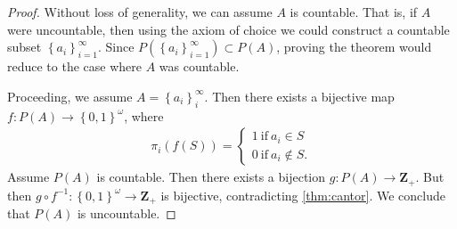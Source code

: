 \begin{proof}
	Without loss of generality, we can assume $A$ is countable. That is, if $A$
	were uncountable, then using the axiom of choice we could construct a
	countable subset $\left\{ a_{i} \right\}_{i=1}^{\infty}$. Since
	$P(\left\{ a_{i} \right\}_{i=1}^{\infty}) \subset P(A)$, proving the theorem
	would reduce to the case where $A$ was countable.

	Proceeding, we assume $A = \left\{ a_{i} \right\}_{i}^{\infty}$.
	Then there exists a bijective map $f: P(A) \to \left\{ 0,1 \right\}^{\omega}$,
	where
	\begin{equation*}
		\begin{split}
			\pi_{i}(f(S)) = \begin{cases}
				1 \ \text{if} \  a_{i} \in S \\
				0 \ \text{if} \ a_{i} \not \in S.
			\end{cases}
		\end{split}
	\end{equation*}
	Assume $P(A)$ is countable. Then there exists a bijection $g: P(A) \to
	\mathbf{Z}_{+}$. But then $g\circ f^{-1}: \left\{ 0,1 \right\}^{\omega} \to
	\mathbf{Z}_{+}$ is bijective, contradicting \cref{thm:cantor}.
	We conclude that $P(A)$ is uncountable.
\end{proof}
